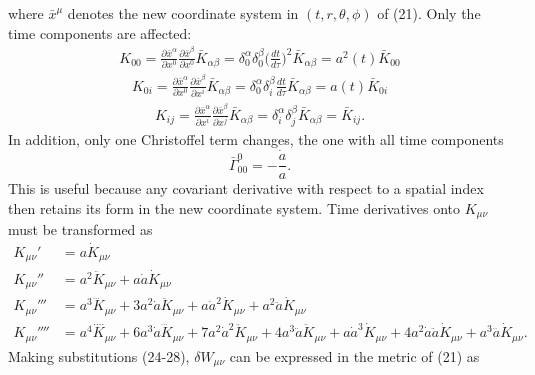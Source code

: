\documentclass[10pt,letterpaper]{article}
\begin{document}
where $\bar x^\mu$ denotes the new coordinate system in $(t,r,\theta,\phi)$ of (21). Only the time components are affected:
\begin{align}
	K_{00} = \frac{\partial \bar x^\alpha}{\partial x^0}\frac{\partial \bar x^\beta}{\partial x^0}\bar K_{\alpha\beta} = \delta^\alpha_0 \delta ^\beta_0 \bigg(\frac{dt}{d\tau}\bigg)^2 \bar K_{\alpha\beta}
	= a^2(t) \bar K_{00}
\end{align}
\begin{align}
	K_{0i} = \frac{\partial \bar x^\alpha}{\partial x^0}\frac{\partial \bar x^\beta}{\partial x^i}\bar K_{\alpha\beta} = \delta^\alpha_0 \delta ^\beta_i \frac{dt}{d\tau} \bar K_{\alpha\beta}
	= a(t)\bar K_{0i}
\end{align}
\begin{align}
	K_{ij} = \frac{\partial \bar x^\alpha}{\partial x^i}\frac{\partial \bar x^\beta}{\partial x^j}\bar K_{\alpha\beta} = \delta^\alpha_i \delta ^\beta_j \bar K_{\alpha\beta}=  \bar K_{ij}.
\end{align}
In addition, only one Christoffel term changes, the one with all time components
\begin{equation}
	\bar \Gamma^{0}_{00} = - \frac{\dot a}{a}.
\end{equation}
This is useful because any covariant derivative with respect to a spatial index then retains its form in the new coordinate system. 
Time derivatives onto $K_{\mu\nu}$ must be transformed as
\begin{align}
	{K}_{\mu \nu} ' &= a \dot{K}_{\mu \nu}\nonumber \\
	{K}_{\mu \nu} ''&=a^2 \ddot{K}_{\mu \nu} + a \dot{a} \dot{K}_{\mu \nu}\nonumber \\
	{K}_{\mu \nu} '''&= a^3 \dddot{K}_{\mu \nu} + 3 a^2 \dot{a} \ddot{K}_{\mu \nu} + a \dot{a}^2 \dot{K}_{\mu \nu} + a^2 \ddot{a} \dot{K}_{\mu \nu}\nonumber \\
	{K}_{\mu \nu} ''''&=a^4 \overset{\text{...}.}{K}_{\mu \nu} + 6 a^3 \dot{a} \dddot{K}_{\mu \nu} + 7 a^2 \dot{a}^2 \ddot{K}_{\mu \nu} + 4 a^3 \ddot{a} \ddot{K}_{\mu \nu} + a \dot{a}^3 \dot{K}_{\mu \nu} + 4 a^2 \dot{a} \ddot{a} \dot{K}_{\mu \nu} + a^3 \dddot{a} \dot{K}_{\mu \nu}. 
\end{align}
Making substitutions (24-28), $\delta W_{\mu\nu}$ can be expressed in the metric of (21) as
\end{document}
